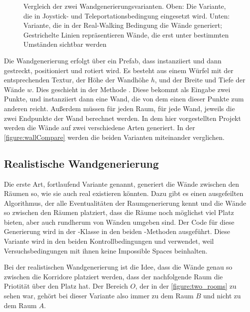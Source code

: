 \begin{figure}[H]
    \centering

    \scalebox{0.4}{}
    \caption{Vergleich der zwei Wandgenerierungsvarianten. Oben: Die  Variante, die in Joystick- und Teleportationsbedingung eingesetzt wird. Unten:  Variante, die in der Real-Walking Bedingung die Wände generiert; Gestrichelte Linien repräsentieren Wände, die erst unter bestimmten Umständen sichtbar werden}
    \label{figure:wallCompare}
\end{figure}

Die Wandgenerierung erfolgt über ein Prefab, dass instanziiert und dann gestreckt, positioniert und rotiert wird. Es besteht aus einem Würfel mit der entsprechenden Textur, der Höhe der Wandhöhe $h$, und der Breite und Tiefe der Wände $w$.
Dies geschieht in der Methode . Diese bekommt als Eingabe zwei Punkte, und instanziiert dann eine Wand, die von dem einen dieser Punkte zum anderen reicht.
Außerdem müssen für jeden Raum, für jede Wand, jeweils die zwei Endpunkte der Wand berechnet werden.
In dem hier vorgestellten Projekt werden die Wände auf zwei verschiedene Arten generiert. In der \autoref{figure:wallCompare} werden die beiden Varianten miteinander verglichen.

\subsection{Realistische Wandgenerierung}\label{subsec:realwallgen}
Die erste Art, fortlaufend  Variante genannt, generiert die Wände zwischen den Räumen so, wie sie auch real existieren könnten.
Dazu gibt es einen ausgefeilten Algorithmus, der alle Eventualitäten der Raumgenerierung kennt und die Wände so zwischen den Räumen platziert, dass die Räume noch möglichst viel Platz bieten, aber auch rundherum von Wänden umgeben sind. Der Code für diese Generierung wird in der -Klasse in den beiden -Methoden ausgeführt. Diese Variante wird in den beiden Kontrollbedingungen  und  verwendet, weil Versuchsbedingungen mit ihnen keine Impossible Spaces beinhalten.

Bei der realistischen Wandgenerierung ist die Idee, dass die Wände genau so zwischen die Korridore platziert werden, dass der nachfolgende Raum die Priotität über den Platz hat. Der Bereich $O$, der in der \autoref{figure:two_rooms} zu sehen war, gehört bei dieser Variante also immer zu dem Raum $B$ und nicht zu dem Raum $A$.


